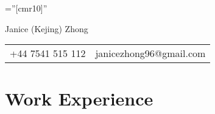\documentclass[a4paper,10pt]{article}
\begin{document}
\pagestyle{empty} %

\font\fb=''[cmr10]'' %

\par{\centering
        {\Huge Janice (Kejing) Zhong}\par}

\begin{center}
\begin{tabular}{l|l}
+44 7541 515 112 & janicezhong96@gmail.com
\end{tabular}
\end{center}

\section{Work Experience}
\noindent
\end{document}
